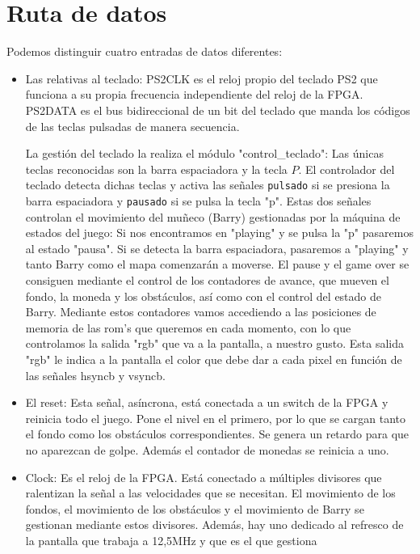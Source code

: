 \documentclass[11pt, a4paper, spanish, openright, twoside]{book}
\begin{document}
\newpage
\mbox{}
\thispagestyle{empty}						%
\newpage


\tableofcontents 							%

\newpage
\mbox{}
\thispagestyle{empty}						%
\newpage


\vspace{3cm}


\section{Ruta de datos}
	Podemos distinguir cuatro entradas de datos diferentes:
	\begin{itemize}	
	\item Las relativas al teclado: PS2CLK es el reloj propio del teclado PS2 que funciona a  su propia frecuencia independiente 
 	del reloj de la FPGA. PS2DATA es el bus bidireccional de un bit del teclado que manda los códigos de las teclas pulsadas de manera secuencia.
	
	La gestión del teclado la realiza el módulo "control\_teclado":	Las únicas teclas reconocidas son la barra espaciadora y la tecla $P$. El controlador del teclado detecta dichas teclas y activa las señales \texttt{pulsado} si se presiona la barra espaciadora y \texttt{pausado} si se pulsa la tecla "p".	
	Estas dos señales controlan el movimiento del muñeco (Barry) gestionadas por la máquina de estados del juego: Si nos encontramos en "playing" y se pulsa la "p"  pasaremos al estado "pausa". Si se detecta la barra espaciadora, pasaremos
	 a "playing" y tanto Barry como el mapa comenzarán a moverse. El pause y el game over se consiguen mediante el control de los contadores de avance, que mueven el fondo, la moneda y los obstáculos, así como con el control del estado de Barry.
	Mediante estos contadores vamos accediendo a las posiciones de memoria de las rom's que queremos en cada momento, con lo que controlamos la salida "rgb"  que va a la pantalla, a nuestro gusto. Esta salida "rgb" le indica a la pantalla el color que debe dar a cada pixel
	en función de las señales hsyncb y vsyncb.

	\item El reset:	Esta señal, asíncrona, está conectada a un switch de la FPGA y reinicia todo el juego. Pone el nivel en el primero, por lo que se cargan tanto el fondo como los obstáculos correspondientes. Se genera un retardo para que no aparezcan de golpe. Además el contador de monedas se reinicia a uno.
	\item Clock: Es el reloj de la FPGA. Está conectado a múltiples divisores que ralentizan la señal a las velocidades que se necesitan. El movimiento de los fondos, el movimiento de los obstáculos y el movimiento de Barry se gestionan mediante
	estos divisores. Además, hay uno dedicado al refresco de la pantalla que trabaja a 12,5MHz y que es el que gestiona
	
\end{itemize}
\end{document}
